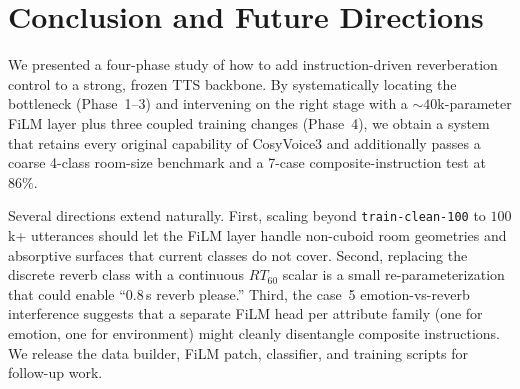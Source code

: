\documentclass{article}
\begin{document}
\section{Conclusion and Future Directions}

We presented a four-phase study of how to add instruction-driven reverberation
control to a strong, frozen TTS backbone. By systematically locating the
bottleneck (Phase~1--3) and intervening on the right stage with a
$\sim 40$k-parameter FiLM layer plus three coupled training changes
(Phase~4), we obtain a system that retains every original capability of
CosyVoice3 and additionally passes a coarse 4-class room-size benchmark and
a 7-case composite-instruction test at $86\%$.

Several directions extend naturally. First, scaling beyond
\texttt{train-clean-100} to $100$k+ utterances should let the FiLM layer
handle non-cuboid room geometries and absorptive surfaces that current
classes do not cover. Second, replacing the discrete reverb class with a
continuous $RT_{60}$ scalar is a small re-parameterization that could enable
``$0.8$\,s reverb please.'' Third, the case~5 emotion-vs-reverb interference
suggests that a separate FiLM head per attribute family (one for emotion,
one for environment) might cleanly disentangle composite instructions. We
release the data builder, FiLM patch, classifier, and training scripts
for follow-up work.



\end{document}
